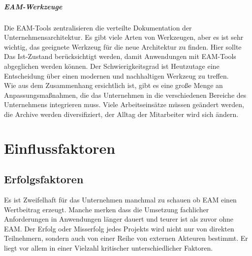 \documentclass[
	A4paper,
	DIV=9,
	BCOR7mm,
	smallheadings,
	headinclude,
	footinclude,
	headsepline,
	parindent,
	german,
	captions=tableheading,
	abstracton
	]{scrreprt}
\begin{document}
\paragraph{EAM-Werkzeuge}
Die EAM-Tools zentralisieren die verteilte Dokumentation der Unternehmensarchitektur. Es gibt viele Arten von Werkzeugen, aber es ist sehr wichtig, das geeignete Werkzeug für die neue Architektur zu finden. Hier sollte Das Ist-Zustand berücksichtigt werden, damit Anwendungen mit EAM-Tools abgeglichen werden können. Der Schwierigkeitsgrad ist Heutzutage eine Entscheidung über einen modernen und nachhaltigen Werkzeug zu treffen.
\mbox{}\\

Wie aus dem Zusammenhang ersichtlich ist, gibt es eine große Menge an Anpassungsmaßnahmen, die das Unternehmen in die verschiedenen Bereiche des Unternehmens integrieren muss. Viele Arbeitseinsätze müssen geändert werden, die Archive werden diversifiziert, der Alltag der Mitarbeiter wird sich ändern.

\chapter{Einflussfaktoren}
\section{Erfolgsfaktoren}
Es ist Zweifelhaft für das Unternehmen manchmal zu schauen ob EAM  einen Wertbeitrag erzeugt. Manche merken dass die Umsetzung fachlicher Anforderungen in Anwendungen länger dauert und teurer ist als zuvor ohne EAM.
Der Erfolg oder Misserfolg jedes Projekts wird nicht nur von direkten Teilnehmern, sondern auch von einer Reihe von externen Akteuren bestimmt. Er  liegt vor allem in einer Vielzahl kritischer unterschiedlicher Faktoren.
\end{document}
